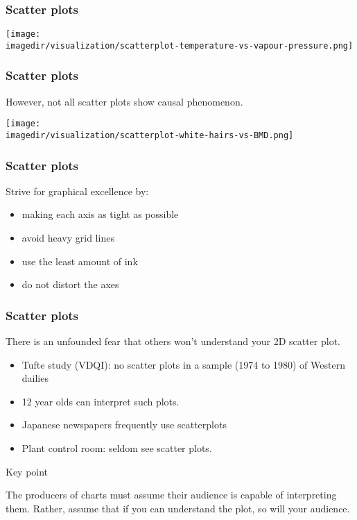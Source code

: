 \begin{frame}\frametitle{Scatter plots}
	\begin{center}
		\texttt{[image: \\imagedir/visualization/scatterplot-temperature-vs-vapour-pressure.png]}
	\end{center}
\end{frame}

\begin{frame}\frametitle{Scatter plots}
	
	However, not all scatter plots show causal phenomenon. 
	\begin{center}
		\texttt{[image: \\imagedir/visualization/scatterplot-white-hairs-vs-BMD.png]}
	\end{center}
\end{frame}

\begin{frame}\frametitle{Scatter plots}
	
	Strive for graphical excellence by:
	\begin{itemize}
		\item	making each axis as tight as possible 
		\item	avoid heavy grid lines 
		\item	use the least amount of ink 
		\item	do not distort the axes 
	\end{itemize}
\end{frame}

\begin{frame}\frametitle{Scatter plots}
	
	There is an unfounded fear that others won't understand your 2D scatter plot. 
	\begin{itemize}
		\item	Tufte study (VDQI): no scatter plots in a sample (1974 to 1980) of Western dailies 
		\item	12 year olds can interpret such plots. 
		\item	Japanese newspapers frequently use scatterplots 
		\item	Plant control room: seldom see scatter plots. 
	\end{itemize}
	\begin{block}
		{Key point} 
		\begin{center}
			The producers of charts must assume their audience is capable of interpreting them. Rather, assume that if you can understand the plot, so will your audience. 
		\end{center}
	\end{block}
\end{frame}

